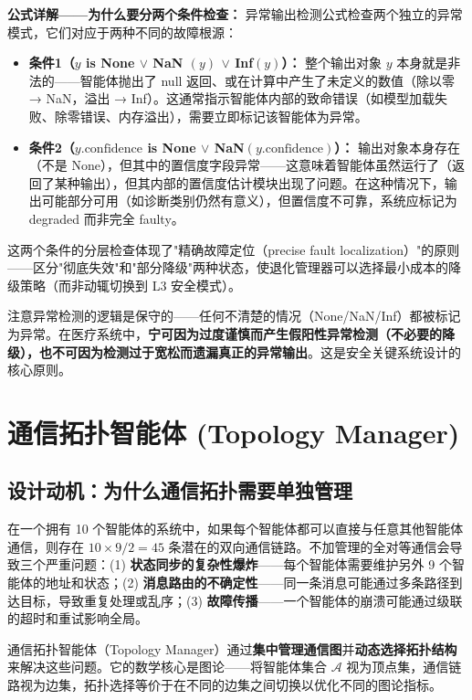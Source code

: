 \documentclass[11pt,a4paper]{ctexart}
\theoremstyle{remark}
\begin{document}
\textbf{公式详解——为什么要分两个条件检查：} 异常输出检测公式检查两个独立的异常模式，它们对应于两种不同的故障根源：
\begin{itemize}[nosep]
\item \textbf{条件1（$y$ is None $\lor$ NaN $(y)$ $\lor$ Inf$(y)$）：} 整个输出对象 $y$ 本身就是非法的——智能体抛出了 null 返回、或在计算中产生了未定义的数值（除以零 → NaN，溢出 → Inf）。这通常指示智能体内部的致命错误（如模型加载失败、除零错误、内存溢出），需要立即标记该智能体为异常。
\item \textbf{条件2（$y.\text{confidence}$ is None $\lor$ NaN$(y.\text{confidence})$）：} 输出对象本身存在（不是 None），但其中的置信度字段异常——这意味着智能体虽然运行了（返回了某种输出），但其内部的置信度估计模块出现了问题。在这种情况下，输出可能部分可用（如诊断类别仍然有意义），但置信度不可靠，系统应标记为 degraded 而非完全 faulty。
\end{itemize}
这两个条件的分层检查体现了"精确故障定位（precise fault localization）"的原则——区分"彻底失效"和"部分降级"两种状态，使退化管理器可以选择最小成本的降级策略（而非动辄切换到 L3 安全模式）。

注意异常检测的逻辑是保守的——任何不清楚的情况（None/NaN/Inf）都被标记为异常。在医疗系统中，\textbf{宁可因为过度谨慎而产生假阳性异常检测（不必要的降级），也不可因为检测过于宽松而遗漏真正的异常输出}。这是安全关键系统设计的核心原则。

\section{通信拓扑智能体 (Topology Manager)}

\subsection{设计动机：为什么通信拓扑需要单独管理}

在一个拥有 10 个智能体的系统中，如果每个智能体都可以直接与任意其他智能体通信，则存在 $10 \times 9 / 2 = 45$ 条潜在的双向通信链路。不加管理的全对等通信会导致三个严重问题：(1) \textbf{状态同步的复杂性爆炸}——每个智能体需要维护另外 9 个智能体的地址和状态；(2) \textbf{消息路由的不确定性}——同一条消息可能通过多条路径到达目标，导致重复处理或乱序；(3) \textbf{故障传播}——一个智能体的崩溃可能通过级联的超时和重试影响全局。

通信拓扑智能体（Topology Manager）通过\textbf{集中管理通信图}并\textbf{动态选择拓扑结构}来解决这些问题。它的数学核心是图论——将智能体集合 $\mathcal{A}$ 视为顶点集，通信链路视为边集，拓扑选择等价于在不同的边集之间切换以优化不同的图论指标。
\end{document}
